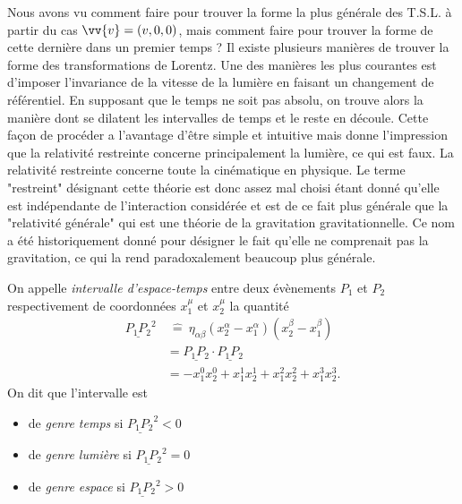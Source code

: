 \documentclass[a4paper,11pt]{report}
\begin{document}
            Nous avons vu comment faire pour trouver la forme la plus générale des T.S.L. à partir du cas $\vv{v} = (v,0,0)$, mais comment faire pour trouver la forme de cette dernière dans un premier temps ? Il existe plusieurs manières de trouver la forme des transformations de Lorentz. Une des manières les plus courantes est d'imposer l'invariance de la vitesse de la lumière en faisant un changement de référentiel. En supposant que le temps ne soit pas absolu, on trouve alors la manière dont se dilatent les intervalles de temps et le reste en découle. Cette façon de procéder a l'avantage d'être simple et intuitive mais donne l'impression que la relativité restreinte concerne principalement la lumière, ce qui est faux. La relativité restreinte concerne toute la cinématique en physique. Le terme "restreint" désignant cette théorie est donc assez mal choisi étant donné qu'elle est indépendante de l'interaction considérée et est de ce fait plus générale que la "relativité générale" qui est une théorie de la gravitation gravitationnelle. Ce nom a été historiquement donné pour désigner le fait qu'elle ne comprenait pas la gravitation, ce qui la rend paradoxalement beaucoup plus générale.
            
            \begin{defn}
                On appelle \textit{intervalle d'espace-temps} entre deux évènements $P_1$ et $P_2$ respectivement de coordonnées $x_1^\mu$ et $x_2^\mu$ la quantité
                \begin{align}
                    \underline{P_1P_2}^2&~\hat{=}~ \eta_{\alpha\beta}(x_2^\alpha-x_1^\alpha)(x_2^\beta-x_1^\beta) \\
                    &= \underline{P_1P_2}\cdot\underline{P_1P_2} \\
                    &= -x_1^0 x_2^0 + x_1^1 x_2^1 + x_1^2 x_2^2 + x_1^3 x_2^3.
                \end{align}
                $$$$
                On dit que l'intervalle est 
                \begin{itemize}[label = \textbullet]
                    \item de \textit{genre temps} si $\underline{P_1P_2}^2<0$
                    \item de \textit{genre lumière} si $\underline{P_1P_2}^2=0$
                    \item de \textit{genre espace} si $\underline{P_1P_2}^2>0$
                \end{itemize}
            \end{defn}
            
\end{document}
